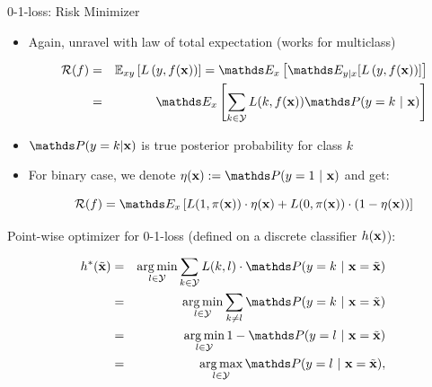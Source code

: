 \documentclass[11pt,compress,t,notes=noshow, xcolor=table]{beamer}
\begin{document}
\begin{vbframe}{0-1-loss: Risk Minimizer}

\begin{itemize}

\item Again, unravel with law of total expectation (works for multiclass)

\vspace*{-0.5cm}

\begin{eqnarray*}
  \riskf  & = & \Exy\left[\Lxy\right] = \E_x \left[ \E_{y|x} [ \Lxy ] \right] \\
          & = & \E_x \left[\sum_{k \in \Yspace} L(k, \fx) \P(y = k~|~ \xv)\right] 
\end{eqnarray*}

\item $\P(y = k| \xv)$ is true posterior probability for class $k$

\item For binary case, we denote $\eta(\xv) := \P(y = 1 ~|~ \xv)$ and get: 

$$
\riskf = \E_x \left[L(1, \pix) \cdot \eta(\xv) + L(0, \pix) \cdot (1 - \eta(\xv)) \right]
$$





\end{itemize}


\framebreak 


Point-wise optimizer for 0-1-loss (defined on a discrete classifier $h(\mathbf{x})$): 

  \begin{eqnarray*}  
  h^{\ast}(\xtil) &=& \argmin_{l \in \Yspace} \sum_{k \in \Yspace} L(k, l) \cdot \P(y = k~|~\xv = \xtil) \\
  &=& \argmin_{l \in \Yspace} \sum_{k \ne l} \P(y = k~|~\xv = \xtil) \\ 
  &=& \argmin_{l \in \Yspace} 1 - \P(y = l~|~\xv = \xtil) \\
  &=& \argmax_{l \in \Yspace} \P(y = l~|~ \xv = \xtil),
  \end{eqnarray*}


\end{vbframe}
\end{document}
